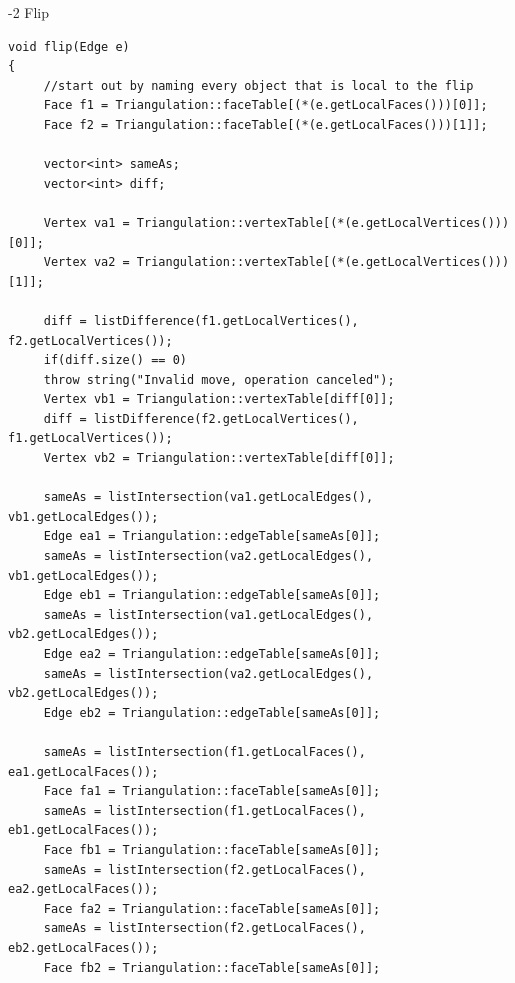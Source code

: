 \documentclass[12pt]{article}
\begin{document}
-2 Flip
\begin{verbatim}
void flip(Edge e)
{
     //start out by naming every object that is local to the flip
     Face f1 = Triangulation::faceTable[(*(e.getLocalFaces()))[0]];
     Face f2 = Triangulation::faceTable[(*(e.getLocalFaces()))[1]];
     
     vector<int> sameAs;
     vector<int> diff;
     
     Vertex va1 = Triangulation::vertexTable[(*(e.getLocalVertices()))[0]];
     Vertex va2 = Triangulation::vertexTable[(*(e.getLocalVertices()))[1]];
          
     diff = listDifference(f1.getLocalVertices(), f2.getLocalVertices());
     if(diff.size() == 0)
     throw string("Invalid move, operation canceled");
     Vertex vb1 = Triangulation::vertexTable[diff[0]];
     diff = listDifference(f2.getLocalVertices(), f1.getLocalVertices());
     Vertex vb2 = Triangulation::vertexTable[diff[0]];
     
     sameAs = listIntersection(va1.getLocalEdges(), vb1.getLocalEdges());
     Edge ea1 = Triangulation::edgeTable[sameAs[0]];
     sameAs = listIntersection(va2.getLocalEdges(), vb1.getLocalEdges());
     Edge eb1 = Triangulation::edgeTable[sameAs[0]];
     sameAs = listIntersection(va1.getLocalEdges(), vb2.getLocalEdges());
     Edge ea2 = Triangulation::edgeTable[sameAs[0]];
     sameAs = listIntersection(va2.getLocalEdges(), vb2.getLocalEdges());
     Edge eb2 = Triangulation::edgeTable[sameAs[0]];
     
     sameAs = listIntersection(f1.getLocalFaces(), ea1.getLocalFaces());
     Face fa1 = Triangulation::faceTable[sameAs[0]];
     sameAs = listIntersection(f1.getLocalFaces(), eb1.getLocalFaces());
     Face fb1 = Triangulation::faceTable[sameAs[0]];
     sameAs = listIntersection(f2.getLocalFaces(), ea2.getLocalFaces());
     Face fa2 = Triangulation::faceTable[sameAs[0]];
     sameAs = listIntersection(f2.getLocalFaces(), eb2.getLocalFaces());
     Face fb2 = Triangulation::faceTable[sameAs[0]];
     

\end{verbatim}
\end{document}

